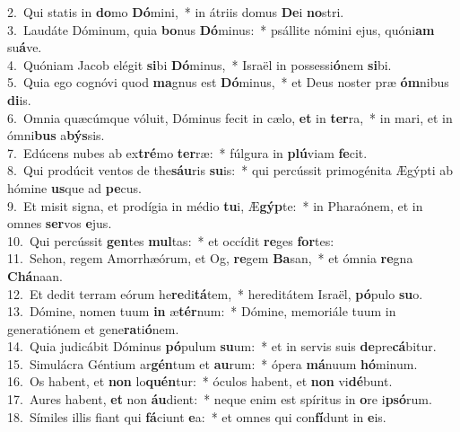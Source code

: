 {2.~}Qui statis in \textbf{do}mo \textbf{Dó}mini,~* in átriis domus \textbf{De}i \textbf{no}stri.\\
{3.~}Laudáte Dóminum, quia \textbf{bo}nus \textbf{Dó}minus:~* psállite nómini ejus, quóni\textbf{am} su\textbf{á}ve.\\
{4.~}Quóniam Jacob elégit \textbf{si}bi \textbf{Dó}minus,~* Israël in possessi\textbf{ó}nem \textbf{si}bi.\\
{5.~}Quia ego cognóvi quod \textbf{ma}gnus est \textbf{Dó}minus,~* et Deus noster præ \textbf{óm}nibus \textbf{di}is.\\
{6.~}Omnia quæcúmque vóluit, Dóminus fecit in cælo, \textbf{et} in \textbf{ter}ra,~* in mari, et in ómni\textbf{bus} a\textbf{býs}sis.\\
{7.~}Edúcens nubes ab ex\textbf{tré}mo \textbf{ter}ræ:~* fúlgura in \textbf{plú}viam \textbf{fe}cit.\\
{8.~}Qui prodúcit ventos de the\textbf{sáu}ris \textbf{su}is:~* qui percússit primogénita Ægýpti ab hómine \textbf{us}que ad \textbf{pe}cus.\\
{9.~}Et misit signa, et prodígia in médio \textbf{tu}i, Æ\textbf{gýp}te:~* in Pharaónem, et in omnes \textbf{ser}vos \textbf{e}jus.\\
{10.~}Qui percússit \textbf{gen}tes \textbf{mul}tas:~* et occídit \textbf{re}ges \textbf{for}tes:\\
{11.~}Sehon, regem Amorrhæórum, et Og, \textbf{re}gem \textbf{Ba}san,~* et ómnia \textbf{re}gna \textbf{Chá}naan.\\
{12.~}Et dedit terram eórum he\textbf{re}di\textbf{tá}tem,~* hereditátem Israël, \textbf{pó}pulo \textbf{su}o.\\
{13.~}Dómine, nomen tuum \textbf{in} æ\textbf{tér}num:~* Dómine, memoriále tuum in generatiónem et gene\textbf{ra}ti\textbf{ó}nem.\\
{14.~}Quia judicábit Dóminus \textbf{pó}pulum \textbf{su}um:~* et in servis suis \textbf{de}pre\textbf{cá}bitur.\\
{15.~}Simulácra Géntium ar\textbf{gén}tum et \textbf{au}rum:~* ópera \textbf{má}nuum \textbf{hó}minum.\\
{16.~}Os habent, et \textbf{non} lo\textbf{quén}tur:~* óculos habent, et \textbf{non} vi\textbf{dé}bunt.\\
{17.~}Aures habent, \textbf{et} non \textbf{áu}dient:~* neque enim est spíritus in \textbf{o}re i\textbf{psó}rum.\\
{18.~}Símiles illis fiant qui \textbf{fá}ciunt \textbf{e}a:~* et omnes qui con\textbf{fí}dunt in \textbf{e}is.\\
